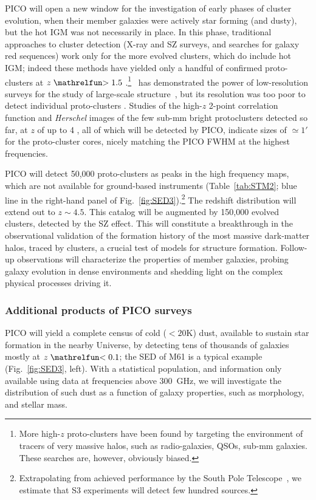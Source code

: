 \documentclass[PICOReport.tex]{subfiles}
\begin{document}
PICO will open a new window for the investigation of early phases of cluster evolution, when their member galaxies were actively star forming (and dusty), but the hot \ac{IGM} was not necessarily in place. In this phase, traditional approaches to cluster detection (X-ray and SZ surveys, and searches for galaxy red sequences) work only for the more evolved clusters, which do include hot \ac{IGM}; indeed these methods have yielded only a handful of confirmed proto-clusters at $z\simgt 1.5$ \cite{Overzier2016}.\footnote{More high-$z$ proto-clusters have been found by targeting the environment of tracers of very massive halos, such as radio-galaxies, QSOs, sub-mm galaxies. These searches are, however, obviously biased.} \planck~has demonstrated the power of low-resolution surveys for the study of large-scale structure~\cite{Planck2016high_z}, but its resolution was too poor to detect individual proto-clusters \cite{Negrello2017protocl}.  Studies of the high-$z$ 2-point correlation function \cite{Chen2016, Negrello2017protocl} and \textit{Herschel} images of the few sub-mm bright protoclusters detected so far, at $z$ of up to 4 \cite{Ivison2013, Wang2016, Oteo2018}, all of which will be detected by PICO, indicate sizes of $\simeq 1'$ for the proto-cluster cores, nicely matching the PICO FWHM at the highest frequencies.

PICO will detect 50,000 proto-clusters as peaks in the high frequency maps, which are not available for ground-based instruments (Table~\ref{tab:STM2}; blue line in the right-hand panel of Fig.~\ref{fig:SED3}).\footnote{Extrapolating from achieved performance by the South Pole Telescope~\cite{??}, we estimate that S3 experiments will detect few hundred sources.} The redshift distribution will extend out to $z\sim4.5$. This catalog will be augmented by 150,000 evolved clusters, detected by the SZ effect. This will constitute a breakthrough in the observational validation of the formation history of the most massive dark-matter halos, traced by clusters, a crucial test of models for structure formation. Follow-up observations will characterize the properties of member galaxies, probing galaxy evolution in dense environments and shedding light on the complex physical processes driving it.

\subsubsection{Additional products of PICO surveys}

PICO will yield a complete census of cold ($<20$K) dust, available to sustain star formation in the nearby Universe, by detecting tens of thousands of galaxies mostly at $z\simlt 0.1$; the \ac{SED} of M61 is a typical example (Fig.~\ref{fig:SED3}, left). With a statistical population, and information only available using data at frequencies above 300~GHz, we will investigate the distribution of such dust as a function of galaxy properties, such as morphology, and stellar mass. 
\end{document}
